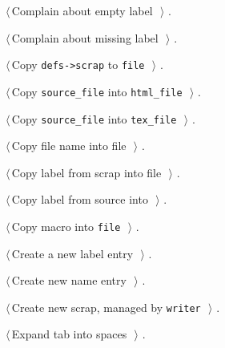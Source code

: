 \documentclass{report}
\begin{document}
{\begin{list}{}{\setlength{\itemsep}{-\parsep}\setlength{\itemindent}{-\leftmargin}}
\item $\langle\,$Complain about empty label\nobreak\ {\footnotesize {}}$\,\rangle$ {\footnotesize {\NWtxtRefIn} .}
\item $\langle\,$Complain about missing label\nobreak\ {\footnotesize {}}$\,\rangle$ {\footnotesize {\NWtxtRefIn} .}
\item $\langle\,$Copy \verb|defs->scrap| to \verb|file|\nobreak\ {\footnotesize {}}$\,\rangle$ {\footnotesize {\NWtxtRefIn} .}
\item $\langle\,$Copy \verb|source_file| into \verb|html_file|\nobreak\ {\footnotesize {}}$\,\rangle$ {\footnotesize {\NWtxtRefIn} .}
\item $\langle\,$Copy \verb|source_file| into \verb|tex_file|\nobreak\ {\footnotesize {}}$\,\rangle$ {\footnotesize {\NWtxtRefIn} .}
\item $\langle\,$Copy file name into file\nobreak\ {\footnotesize {}}$\,\rangle$ {\footnotesize {\NWtxtRefIn} .}
\item $\langle\,$Copy label from scrap into file\nobreak\ {\footnotesize {}}$\,\rangle$ {\footnotesize {\NWtxtRefIn} .}
\item $\langle\,$Copy label from source into\nobreak\ {\footnotesize {}}$\,\rangle$ {\footnotesize {\NWtxtRefIn} .
}
\item $\langle\,$Copy macro into \verb|file|\nobreak\ {\footnotesize {}}$\,\rangle$ {\footnotesize {\NWtxtRefIn} .}
\item $\langle\,$Create a new label entry\nobreak\ {\footnotesize {}}$\,\rangle$ {\footnotesize {\NWtxtRefIn} .}
\item $\langle\,$Create new name entry\nobreak\ {\footnotesize {}}$\,\rangle$ {\footnotesize {\NWtxtRefIn} .
}
\item $\langle\,$Create new scrap, managed by \verb|writer|\nobreak\ {\footnotesize {}}$\,\rangle$ {\footnotesize {\NWtxtRefIn} .}
\item $\langle\,$Expand tab into spaces\nobreak\ {\footnotesize {}}$\,\rangle$ {\footnotesize {\NWtxtRefIn} .
}

\end{list}}
\end{document}
